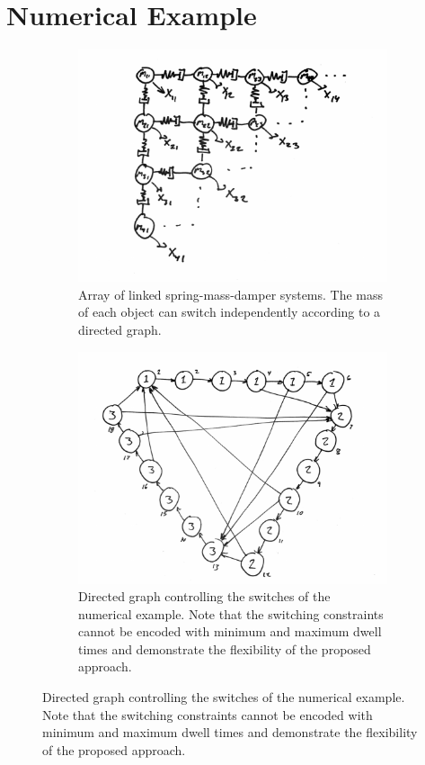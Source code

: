 \section{Numerical Example}
\begin{figure}
	\centering
	\begin{subfigure}[t]{0.475\columnwidth}
		\centering
		\includegraphics[width=\textwidth]{./figures/num_ex_sys}
		\caption{Array of linked spring-mass-damper systems. The mass of each object can switch independently according to a directed graph.}
		\label{fig:num_ex_sys}
	\end{subfigure}
	\hfill
	\begin{subfigure}[t]{0.475\columnwidth}
		\centering
		\includegraphics[width=\textwidth]{./figures/num_ex_graph}
		\caption{Directed graph controlling the switches of the numerical example. Note that the switching constraints cannot be encoded with minimum and maximum dwell times and demonstrate the flexibility of the proposed approach.}
		\label{fig:num_ex_graph}
	\end{subfigure}
\end{figure}


